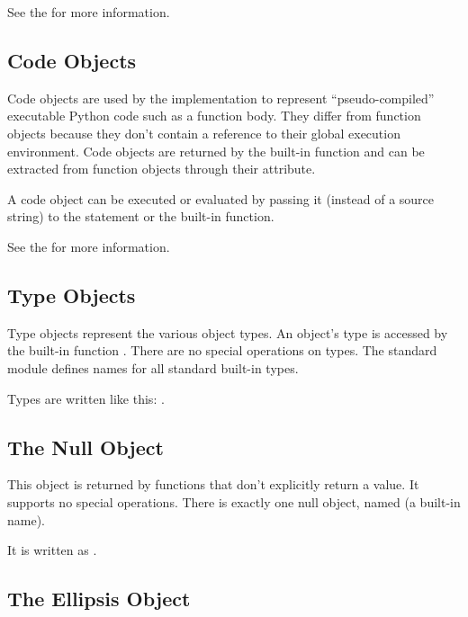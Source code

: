 See the  for more
information.


\subsection{Code Objects \label{bltin-code-objects}}

Code objects are used by the implementation to represent
``pseudo-compiled'' executable Python code such as a function body.
They differ from function objects because they don't contain a
reference to their global execution environment.  Code objects are
returned by the built-in  function and can be
extracted from function objects through their 
attribute.

A code object can be executed or evaluated by passing it (instead of a
source string) to the  statement or the built-in
 function.

See the  for more
information.


\subsection{Type Objects \label{bltin-type-objects}}

Type objects represent the various object types.  An object's type is
accessed by the built-in function .  There are no special
operations on types.  The standard module  defines names
for all standard built-in types.

Types are written like this: .


\subsection{The Null Object \label{bltin-null-object}}

This object is returned by functions that don't explicitly return a
value.  It supports no special operations.  There is exactly one null
object, named  (a built-in name).

It is written as .


\subsection{The Ellipsis Object \label{bltin-ellipsis-object}}

